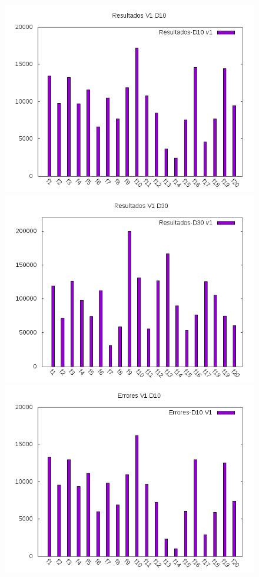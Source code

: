\documentclass[12pt,a4paper]{article}
\begin{document}
	\begin{figure}[!h]
		\includegraphics[scale=0.5]{../Algoritmo/resultados/Imagenes/Resultados/resultados_v1_d10.png}
		\includegraphics[scale=0.5]{../Algoritmo/resultados/Imagenes/Resultados/resultados_v1_d30.png}
		\includegraphics[scale=0.5]{../Algoritmo/resultados/Imagenes/Errores/errores_v1_d10.png}

\end{figure}
\end{document}
